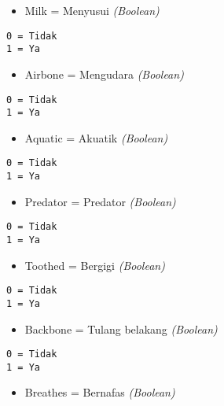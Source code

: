 \documentclass[
  letterpaper,
]{krantz}
\providecommand{\tightlist}{%
  \setlength{\itemsep}{0pt}\setlength{\parskip}{0pt}}\usepackage{longtable,booktabs,array}
\begin{document}
\begin{itemize}
\tightlist
\item
  Milk = Menyusui \emph{(Boolean)}
\end{itemize}

\begin{verbatim}
0 = Tidak
1 = Ya
\end{verbatim}

\begin{itemize}
\tightlist
\item
  Airbone = Mengudara \emph{(Boolean)}
\end{itemize}

\begin{verbatim}
0 = Tidak
1 = Ya
\end{verbatim}

\begin{itemize}
\tightlist
\item
  Aquatic = Akuatik \emph{(Boolean)}
\end{itemize}

\begin{verbatim}
0 = Tidak
1 = Ya
\end{verbatim}

\begin{itemize}
\tightlist
\item
  Predator = Predator \emph{(Boolean)}
\end{itemize}

\begin{verbatim}
0 = Tidak
1 = Ya
\end{verbatim}

\begin{itemize}
\tightlist
\item
  Toothed = Bergigi \emph{(Boolean)}
\end{itemize}

\begin{verbatim}
0 = Tidak
1 = Ya
\end{verbatim}

\begin{itemize}
\tightlist
\item
  Backbone = Tulang belakang \emph{(Boolean)}
\end{itemize}

\begin{verbatim}
0 = Tidak
1 = Ya
\end{verbatim}

\begin{itemize}
\tightlist
\item
  Breathes = Bernafas \emph{(Boolean)}
\end{itemize}
\end{document}
